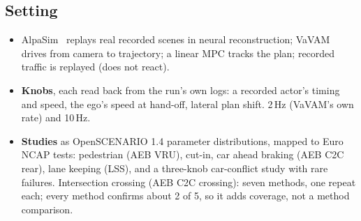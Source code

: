 \documentclass[conference]{IEEEtran}
\begin{document}
\subsection{Setting}
\begin{itemize}
\item AlpaSim~\cite{alpasim} replays real recorded scenes in neural reconstruction; VaVAM~\cite{bartoccioni2025vavam} drives from camera to trajectory; a linear MPC tracks the plan; recorded traffic is replayed (does not react).
\item \textbf{Knobs}, each read back from the run's own logs: a recorded actor's timing and speed, the ego's speed at hand-off, lateral plan shift. 2\,Hz (VaVAM's own rate) and 10\,Hz.
\item \textbf{Studies} as OpenSCENARIO 1.4 parameter distributions, mapped to Euro NCAP tests: pedestrian (AEB VRU), cut-in, car ahead braking (AEB C2C rear), lane keeping (LSS), and a three-knob car-conflict study with rare failures. Intersection crossing (AEB C2C crossing): seven methods, one repeat each; every method confirms about 2 of 5, so it adds coverage, not a method comparison.
\end{itemize}
\end{document}
